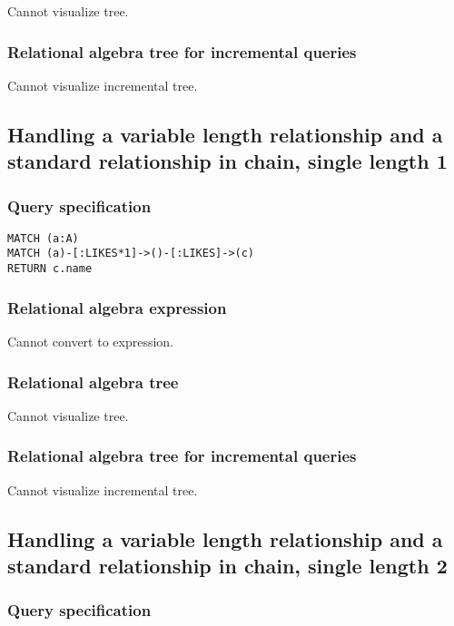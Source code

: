 Cannot visualize tree.

\subsubsection*{Relational algebra tree for incremental queries}

Cannot visualize incremental tree.

\subsection{Handling a variable length relationship and a standard relationship in chain, single length 1}

\subsubsection*{Query specification}

\begin{lstlisting}
MATCH (a:A)
MATCH (a)-[:LIKES*1]->()-[:LIKES]->(c)
RETURN c.name
\end{lstlisting}

\subsubsection*{Relational algebra expression}

Cannot convert to expression.

\subsubsection*{Relational algebra tree}

Cannot visualize tree.

\subsubsection*{Relational algebra tree for incremental queries}

Cannot visualize incremental tree.

\subsection{Handling a variable length relationship and a standard relationship in chain, single length 2}

\subsubsection*{Query specification}

